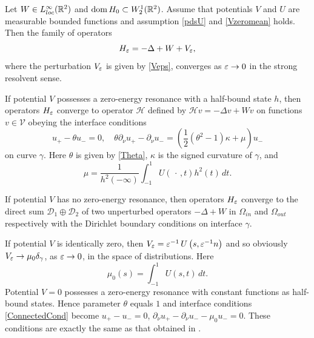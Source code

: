 \begin{theorem}\label{MainThrm}
Let $W\in L^\infty_{loc}(\mathbb R^2)$ and  $\mathop{\rm dom} H_0\subset W_2^1(\mathbb R^2)$.
Assume  that potentials $V$ and $U$  are measurable bounded functions and assumption \eqref{pdsU} and \eqref{Vzeromean}  holds.
Then the family of operators
$$
 H_\varepsilon=-\Delta +W+V_\varepsilon,
$$
where the perturbation $V_\varepsilon$ is given by \eqref{Veps},
converges as $\varepsilon\to 0$ in the strong resolvent sense.

If potential $V$ possesses a zero-energy resonance with a half-bound state $h$, then operators $H_\varepsilon$ converge to  operator $\mathcal{H}$
defined by
$
\mathcal{H} v=-\Delta v+Wv
$
on functions $v\in \mathcal{V}$  obeying the interface conditions
\begin{equation}\label{ConnectedCond}
 u_+-\theta u_-=0,\quad  \theta\partial_\nu u_+-\partial_\nu u_-
=\left(\textstyle\frac{1}{2 }(\theta^2-1)\kappa+\mu\right) u_-
\end{equation}
on curve $\gamma$. Here  $\theta$ is given by  \eqref{Theta},  $\kappa$ is the signed curvature of $\gamma$, and
 \begin{equation}\label{Mu}
  \mu=\frac{1}{h^2(-\infty)} \int_{-1}^1 U(\,\cdot\,,t)h^2(t)\, dt.
 \end{equation}


If potential $V$ has no zero-energy resonance, then operators $H_\varepsilon$ converge to the direct sum $\mathcal{D}_1\oplus\mathcal{D}_2$ of two unperturbed operators $-\Delta +W$ in $\Omega_{in}$ and $\Omega_{out}$ respectively with the Dirichlet boundary conditions on interface $\gamma$.
\end{theorem}


\begin{remark}
  If potential $V$ is identically zero, then $V_\varepsilon=\varepsilon^{-1}\,U\left(s,\varepsilon^{-1}n\right)$ and so obviously
$V_\varepsilon\to \mu_0 \delta_\gamma$, as $\varepsilon\to 0$, in the space of distributions. Here
\begin{equation}\label{Mu0}
  \mu_0(s)=\int_{-1}^1U(s,t)\, dt.
\end{equation}
Potential $V=0$ possesses a zero-energy resonance with constant functions as  half-bound states. Hence parameter $\theta$ equals  $1$ and interface conditions \eqref{ConnectedCond} become
$ u_+- u_-=0$,  $\partial_\nu u_+-\partial_\nu u_-
-\mu_0 u_-=0$. These conditions are exactly the same as that obtained in \cite{BEHL2017}.
\end{remark}







